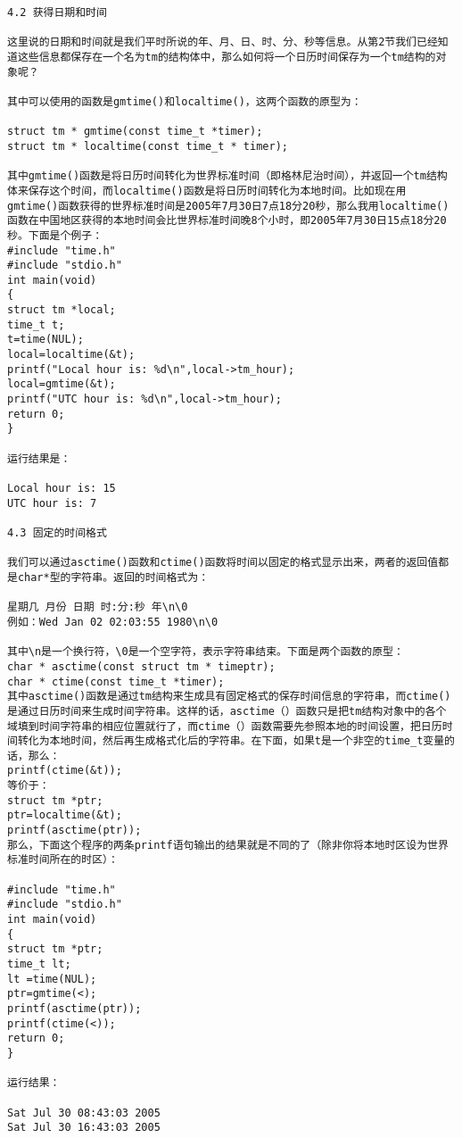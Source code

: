 \begin{verbatim}
4.2 获得日期和时间 

这里说的日期和时间就是我们平时所说的年、月、日、时、分、秒等信息。从第2节我们已经知道这些信息都保存在一个名为tm的结构体中，那么如何将一个日历时间保存为一个tm结构的对象呢？ 

其中可以使用的函数是gmtime()和localtime()，这两个函数的原型为： 

struct tm * gmtime(const time_t *timer); 
struct tm * localtime(const time_t * timer); 

其中gmtime()函数是将日历时间转化为世界标准时间（即格林尼治时间），并返回一个tm结构体来保存这个时间，而localtime()函数是将日历时间转化为本地时间。比如现在用gmtime()函数获得的世界标准时间是2005年7月30日7点18分20秒，那么我用localtime()函数在中国地区获得的本地时间会比世界标准时间晚8个小时，即2005年7月30日15点18分20秒。下面是个例子： 
#include "time.h" 
#include "stdio.h" 
int main(void) 
{ 
struct tm *local; 
time_t t; 
t=time(NUL); 
local=localtime(&t); 
printf("Local hour is: %d\n",local->tm_hour); 
local=gmtime(&t); 
printf("UTC hour is: %d\n",local->tm_hour); 
return 0; 
} 

运行结果是： 

Local hour is: 15 
UTC hour is: 7 

4.3 固定的时间格式 

我们可以通过asctime()函数和ctime()函数将时间以固定的格式显示出来，两者的返回值都是char*型的字符串。返回的时间格式为： 

星期几 月份 日期 时:分:秒 年\n\0 
例如：Wed Jan 02 02:03:55 1980\n\0 

其中\n是一个换行符，\0是一个空字符，表示字符串结束。下面是两个函数的原型： 
char * asctime(const struct tm * timeptr); 
char * ctime(const time_t *timer); 
其中asctime()函数是通过tm结构来生成具有固定格式的保存时间信息的字符串，而ctime()是通过日历时间来生成时间字符串。这样的话，asctime（）函数只是把tm结构对象中的各个域填到时间字符串的相应位置就行了，而ctime（）函数需要先参照本地的时间设置，把日历时间转化为本地时间，然后再生成格式化后的字符串。在下面，如果t是一个非空的time_t变量的话，那么： 
printf(ctime(&t)); 
等价于： 
struct tm *ptr; 
ptr=localtime(&t); 
printf(asctime(ptr)); 
那么，下面这个程序的两条printf语句输出的结果就是不同的了（除非你将本地时区设为世界标准时间所在的时区）： 

#include "time.h" 
#include "stdio.h" 
int main(void) 
{ 
struct tm *ptr; 
time_t lt; 
lt =time(NUL); 
ptr=gmtime(<); 
printf(asctime(ptr)); 
printf(ctime(<)); 
return 0; 
} 

运行结果： 

Sat Jul 30 08:43:03 2005 
Sat Jul 30 16:43:03 2005 


\end{verbatim}
